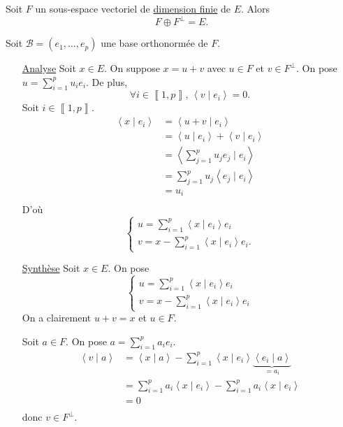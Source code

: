 \begin{thm}
	Soit $F$ un sous-espace vectoriel de \underline{dimension finie} de $E$. Alors \[
		F\oplus F^\perp = E.
	\]
\end{thm}

\begin{prv}
	Soit $\mathcal{B} = (e_1, \ldots, e_p)$ une base orthonormée de $F$.
	\begin{itemize}
		\item[\underline{\sc Analyse}] Soit $x \in E$. On suppose $x = u + v$ avec $u \in F$ et $v \in F^\perp$. On pose $u = \sum_{i=1}^p u_i e_i$. De plus, \[
				\forall i \in \left\llbracket 1,p \right\rrbracket,\,\left<v \mid e_i \right> = 0.
			\] Soit $i \in \left\llbracket 1,p \right\rrbracket$.
			\begin{align*}
				\left<x \mid e_i \right> &= \left<u + v  \mid e_i \right> \\
				&= \left<u \mid e_i \right> + \left<v \mid e_i \right> \\
				&= \left<\sum_{j=1}^p u_j e_j  \mid e_i \right> \\
				&= \sum_{j=1}^p u_j \left<e_j \mid e_i \right> \\
				&= u_i \\
			\end{align*}
			D'où \[
				\begin{cases}
					u = \sum_{i=1}^p \left<x \mid e_i \right> e_i\\
					v = x - \sum_{i=1}^p \left<x \mid e_i \right> e_i.
				\end{cases}
			\]
		\item[\underline{\sc Synthèse}] Soit $x \in E$. On pose \[
				\begin{cases}
					u = \sum_{i=1}^p \left<x \mid e_i \right>e_i\\
					v = x - \sum_{i=1}^p \left<x \mid e_i \right>e_i
				\end{cases}
			\]
			On a clairement $u+v = x$ et $u \in F$.

			Soit $a \in F$. On pose $a = \sum_{i=1}^p a_i e_i$.
			\begin{align*}
				\left<v \mid a \right> &= \left<x \mid a \right> - \sum_{i=1}^p \left<x \mid e_i \right> \underbrace{\left<e_i  \mid a \right>}_{=a_i}\\
				&= \sum_{i=1}^p a_i \left<x \mid e_i \right> - \sum_{i=1}^p a_i \left<x \mid e_i \right> \\
				&= 0 \\
			\end{align*}
			donc $v \in F^\perp$.
	\end{itemize}
\end{prv}

